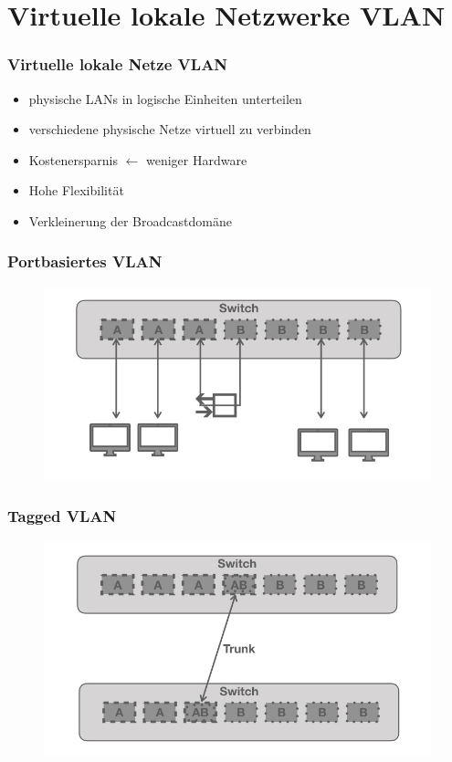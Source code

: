\documentclass[hyperref={pdfpagelabels=false},xcolor=dvipsnames]{beamer}
\newcommand*\mi{ \item[\color{gray}\scalebox{1.2}{\textbullet}]}
\begin{document}
\section{Virtuelle lokale Netzwerke VLAN}
\frame{\sectionpage}
\begin{frame}
	\frametitle{Virtuelle lokale Netze VLAN}
	\begin{itemize}
		\mi  physische LANs in logische Einheiten unterteilen
		\mi verschiedene physische Netze virtuell zu verbinden
		\mi Kostenersparnis $\leftarrow$ weniger Hardware
		\mi Hohe Flexibilität
		\mi Verkleinerung der Broadcastdomäne
		 
		
	\end{itemize}

\end{frame}

\begin{frame}

	\frametitle{Portbasiertes VLAN}
	
	\begin{figure}
	\includegraphics[width=\textwidth]{vlan.001.jpeg}	
	\end{figure}
		
\end{frame}

\begin{frame}
	\frametitle{Tagged VLAN}
		\begin{figure}
	\includegraphics[width=\textwidth]{vlan.002.jpeg}	
	\end{figure}	
\end{frame}
\end{document}
